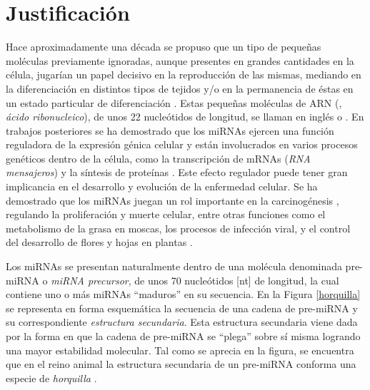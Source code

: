 \documentclass[12pt,bibliography=oldstyle,DIV=12,parskip=full-]{scrartcl}
\begin{document}
\section{Justificación}
%
%
Hace aproximadamente una década se propuso que un tipo de pequeñas
moléculas previamente ignoradas, aunque presentes en grandes
cantidades en la célula, jugarían un papel decisivo en la reproducción
de las mismas, mediando en la diferenciación en distintos tipos de
tejidos y/o en la permanencia de éstas en un estado particular de
diferenciación \cite{lee-mammal}. Estas pequeñas moléculas de ARN
(, \emph{ácido ribonucleico}), de unos 22 nucleótidos de
longitud, se llaman en inglés  o .  En
trabajos posteriores se ha demostrado que los miRNAs ejercen una
función reguladora de la expresión génica celular \cite{bartel116} y
están involucrados en varios procesos genéticos dentro de la célula,
como la transcripción de mRNAs (\emph{RNA mensajeros}) y la síntesis
de proteínas \cite{lili}.  Este efecto regulador puede tener gran
implicancia en el desarrollo y evolución de la enfermedad celular. Se
ha demostrado que los miRNAs juegan un rol importante en la
carcinogénesis \cite{aurora}\cite{lili}, regulando la proliferación y
muerte celular, entre otras funciones como el metabolismo de la grasa
en moscas, los procesos de infección viral, y el control del
desarrollo de flores y hojas en plantas
\cite{bartel116}\cite{lecellier}.

Los miRNAs se presentan naturalmente dentro de una molécula denominada
pre-miRNA o \emph{miRNA precursor}, de unos 70 nucleótidos [nt] de
longitud, la cual contiene uno o más miRNAs ``maduros'' en su
secuencia. En la Figura \ref{horquilla} se representa en forma
esquemática la secuencia de una cadena de pre-miRNA y su
correspondiente \emph{estructura secundaria}. Esta estructura
secundaria viene dada por la forma en que la cadena de pre-miRNA se
``plega'' sobre sí misma logrando una mayor estabilidad molecular. Tal
como se aprecia en la figura, se encuentra que en el reino animal la
estructura secundaria de un pre-miRNA conforma una especie de
\emph{horquilla} \cite{bartel116}\cite{sewer}.
\end{document}
